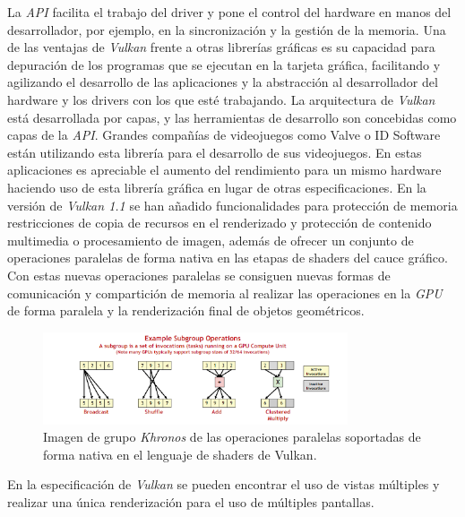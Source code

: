 \documentclass[a4paper]{book}
\begin{document}
La \textit{API} facilita el trabajo del driver y pone el control del hardware en manos del desarrollador, por ejemplo,
en la sincronización y la gestión de la memoria. Una de las ventajas de \textit{Vulkan} frente a otras librerías gráficas
es su capacidad para depuración de los programas que se ejecutan en la tarjeta gráfica, facilitando y agilizando
el desarrollo de las aplicaciones y la abstracción al desarrollador del hardware y los drivers con los que esté
trabajando. La arquitectura de \textit{Vulkan} está desarrollada por capas, y las herramientas de desarrollo son concebidas
como capas de la \textit{API}. Grandes compañías de videojuegos como Valve o ID Software están utilizando esta librería
para el desarrollo de sus videojuegos. En estas aplicaciones es apreciable el aumento del rendimiento para un mismo hardware
haciendo uso de esta librería gráfica en lugar de otras especificaciones. En la versión de \textit{Vulkan 1.1}
se han añadido funcionalidades para protección de memoria restricciones de copia de recursos en el renderizado y protección
de contenido multimedia o procesamiento de imagen, además de ofrecer un conjunto de operaciones paralelas de forma nativa
en las etapas de shaders del cauce gráfico. Con estas nuevas operaciones paralelas se consiguen nuevas formas de comunicación
y compartición de memoria al realizar las operaciones en la \textit{GPU} de forma paralela y la renderización final de objetos
geométricos. \cite{vulkan:_spec11}

\begin{figure}[H]
    \centering
    \includegraphics[width=9cm, keepaspectratio]{img/vulkan_op.png}
    \caption{Imagen de grupo \textit{Khronos} de las operaciones paralelas soportadas de forma nativa en el lenguaje de shaders de Vulkan.}
    \label{vulkan_op}
\end{figure}

En la especificación de \textit{Vulkan} se pueden encontrar el uso de vistas múltiples y realizar una única renderización
para el uso de múltiples pantallas. 
\end{document}
